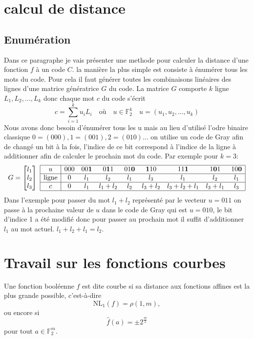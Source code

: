 \documentclass{article}
\def\FF{\ensuremath{\mathbb{F}}}
\begin{document}
\section{calcul de distance}
\subsection{Enumération}
Dans ce paragraphe je vais présenter une methode pour calculer la distance d'une fonction $f$ à un code $C$. la manière la plus simple est consiste à énumérer tous les mots du code.
Pour cela il faut générer toutes les combinaisons linéaires des lignes d'une matrice génératrice $G$ du code. La matrice $G$ comporte $k$ ligne $L_1, L_2, \dots, L_k$ donc chaque mot $c$
du code s'écrit $$c = \sum_{i=1}^{k} u_i L_i \quad \text{où} \quad u \in \FF_2^k \quad u = (u_1, u_2, \dots, u_k)$$
Nous avons donc besoin d'énumérer tous les u mais au lieu d'utilisé l'odre binaire classique $0=(000), 1=(001), 2=(010) \dots$ on utilise un code de Gray afin de changé un bit à la fois, l'indice de ce bit correspond à l'indice de la ligne
à additionner afin de calculer le prochain mot du code. Par exemple pour $k=3$:
$$
G = 
\begin{bmatrix}
	l_1\\
	l_2\\
	l_3\\
\end{bmatrix}
\ 
\begin{array}{|c|cccccccc|}
	\hline
	u & 000 & 00\textbf{1} & 0\textbf{1}1 & 01\textbf{0} & \textbf{1}10 & 11\textbf{1} & 1\textbf{0}1 & 10\textbf{0}\\
	\hline
	\text{ligne} & 0 & l_1 & l_2 & l_1 & l_3 & l_1 & l_2 & l_1\\
	\hline
	c & 0 & l_1 & l_1+l_2 & l_2 & l_3+l_2 & l_3+l_2+l_1 & l_3+l_1 & l_3\\
	\hline
\end{array}
$$
Dans l'exemple pour passer du mot $l_1+l_2$ représenté par le vecteur $u=011$ on passe à la prochaine valeur de $u$ dans le code de Gray qui est $u=010$,
le bit d'indice 1 a été modifié donc pour passer au prochain mot il suffit d'additionner $l_1$ au mot actuel. $l_1+l_2+l_1 = l_2$.

\section{Travail sur les fonctions courbes}

Une fonction booléenne \(f\) est dite courbe si sa distance aux fonctions affines est la plus grande possible, c’est-à-dire
\[
\mathrm{NL}_1(f) = \rho(1,m),
\]
ou encore si
\[
\widehat{f}(a) = \pm 2^{\frac{m}{2}}
\]
pour tout \(a \in \mathbb{F}_2^m\).
\end{document}
